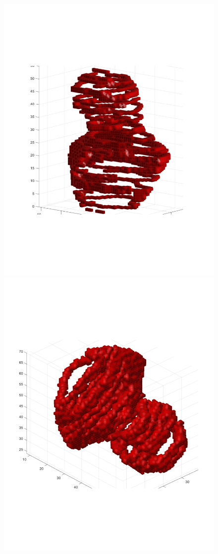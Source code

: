 \documentclass{UCF_ETD}
\begin{document}
\begin{figure}[H]
\begin{center}
\includegraphics[scale=0.42]{RobustRegistration/NoisyVoxelized3DSurfaceData}
\includegraphics[scale=0.42]{RobustRegistration/NoisyTransformedVoxelized3DSurfaceData}

\end{center}
\end{figure}
\end{document}
